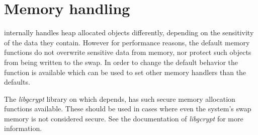 \section{Memory handling}

\gnutls{} internally handles heap allocated objects differently, depending
on the sensitivity of the data they contain. However for performance
reasons, the default memory functions do not overwrite sensitive data from
memory, nor protect such objects from being written to the swap. 
In order to change the default behavior the
function is available which can be used to set other memory 
handlers than the defaults. 
\par
The \emph{libgcrypt} library on which \gnutls{} depends, has such secure
memory allocation functions available. These should be used in cases
where even the system's swap memory is not considered secure. See
the documentation of \emph{libgcrypt} for more information.


